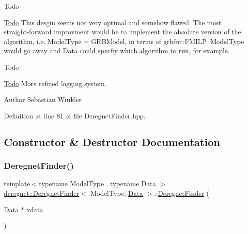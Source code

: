 \begin{DoxyRefDesc}{Todo}
\item[\hyperlink{todo__todo000001}{Todo}]This desgin seems not very optimal and somehow flawed. The most straight-\/forward improvment would be to implement the absolute version of the algorithm, i.\+e. Model\+Type = G\+R\+B\+Model, in terms of grbfrc\+::\+F\+M\+I\+LP. Model\+Type would go away and Data could specfiy which algorithm to run, for example.\end{DoxyRefDesc}


\begin{DoxyRefDesc}{Todo}
\item[\hyperlink{todo__todo000002}{Todo}]More refined logging system.\end{DoxyRefDesc}


\begin{DoxyAuthor}{Author}
Sebastian Winkler 
\end{DoxyAuthor}


Definition at line 81 of file Deregnet\+Finder.\+hpp.



\subsection{Constructor \& Destructor Documentation}
\mbox{\label{classderegnet_1_1DeregnetFinder_a5a19a86a0f9f9fa17e8ab625c748d31a}} 
\subsubsection{\texorpdfstring{Deregnet\+Finder()}{DeregnetFinder()}}
{\footnotesize\ttfamily template$<$typename Model\+Type , typename Data $>$ \\
\hyperlink{classderegnet_1_1DeregnetFinder}{deregnet\+::\+Deregnet\+Finder}$<$ Model\+Type, \hyperlink{avgdrgnt_8cpp_a1d1235306db276e9b36acba1db1509e8}{Data} $>$\+::\hyperlink{classderegnet_1_1DeregnetFinder}{Deregnet\+Finder} (\begin{DoxyParamCaption}\item[{\hyperlink{avgdrgnt_8cpp_a1d1235306db276e9b36acba1db1509e8}{Data} $\ast$}]{xdata }\end{DoxyParamCaption})}



